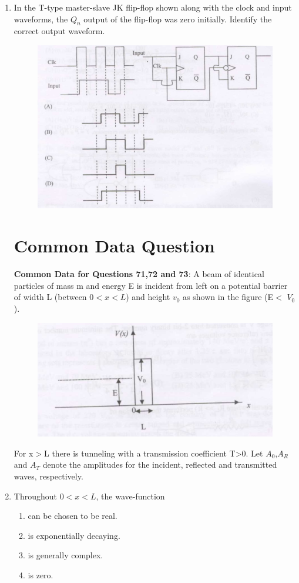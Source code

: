 \documentclass[journal,12pt,onecolumn]{IEEEtran}
\theoremstyle{remark}
\begin{document}
\begin{enumerate}
\item In the T-type master-slave JK flip-flop shown along with the clock and input waveforms, the $Q_n$ output of the flip-flop was zero initially. Identify the correct output waveform.
\begin{figure}[H]
    \centering
    \includegraphics[width = 0.6\columnwidth]{fig/Q.70.png}
    \caption*{}
    \label{fig:Q70}
\end{figure}
\hfill{}
\section*{Common Data Question} 
\textbf{Common Data for  Questions 71,72 and 73}: A beam of identical particles of mass m and energy E is incident from left on a potential barrier of width L (between $0<x<L$) and height $v_0$ as shown in the figure (E$<$ $V_0$ ).
\begin{figure}[H]
    \centering
    \includegraphics[width = 0.6\columnwidth]{fig/Q71 to Q73.png}
    \caption*{}
    \label{fig:Q71 to Q73}
\end{figure}
 For x$>$L there is tunneling with a transmission coefficient T>0. Let $A_0$,$A_R$ and $A_T$  denote the amplitudes for the incident, reflected and transmitted waves, respectively.

\item Throughout $0<x<L$, the wave-function
\hfill{}
\begin{multicols}{2}
\begin{enumerate}
    \item can be chosen to be real.
    \item is exponentially decaying.
    \item is generally complex.
    \item is zero.
\end{enumerate}
\end{multicols}


\end{enumerate}
\end{document}
